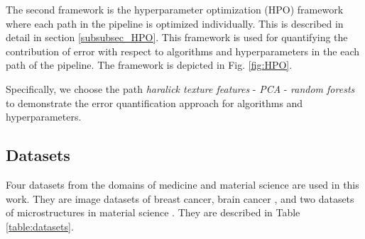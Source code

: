 The second framework is the hyperparameter optimization (HPO) framework where each path in the pipeline is optimized individually. This is described in detail in section \ref{subsubsec_HPO}. This framework is used for quantifying the contribution of error with respect to algorithms and hyperparameters in the each path of the pipeline. The framework is depicted in Fig. \ref{fig:HPO}.

Specifically, we choose the path \textit{haralick texture features} - \textit{PCA} - \textit{random forests} to demonstrate the error quantification approach for algorithms and hyperparameters.

\subsection{Datasets}
Four datasets from the domains of medicine and material science are used in this work. They are image datasets of breast cancer\cite{bilgin2007cell}, brain cancer \cite{gunduz2004cell}, and two datasets of microstructures in material science \cite{chowdhury2016image}. They are described in Table \ref{table:datasets}.


